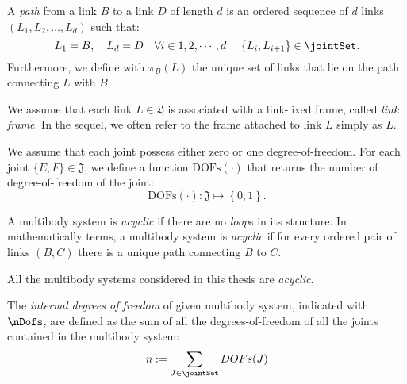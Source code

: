 \begin{definition}[Path]
A \emph{path} from a link $B$ to a link $D$ of length $d$ is an ordered sequence of $d$ links $(L_1,L_2,\dots,L_d)$ such that: 
\begin{equation}
L_1 = B, \quad L_d = D \quad \forall i \in 1,2,\cdots,d \ \hspace{1em}  \{L_i,L_{i+1}\} \in \jointSet.
\end{equation}
Furthermore, we define with $\pi_B(L)$ the unique set of links that lie on the path connecting $L$ with $B$.
\end{definition}

\begin{assumption}
We assume that each link $L \in \mathfrak{L}$ is associated with a link-fixed frame, called \emph{link frame}. In the sequel, we  often refer to the frame attached to link $L$ simply as $L$.
\end{assumption}


\begin{assumption}
We assume that each joint possess either zero or one degree-of-freedom. For each joint $\{E,F\} \in \mathfrak{J}$, we define a function $\text{DOFs}(\cdot)$ that returns the number of degree-of-freedom of the joint:
$$
\text{DOFs}(\cdot) : \mathfrak{J} \mapsto \left\{ 0,1 \right\} .
$$
\end{assumption}

\begin{definition}
A multibody system is \emph{acyclic} if there are no \emph{loop}s in its structure. In mathematically terms, a multibody system is \emph{acyclic} if for every ordered pair of links $(B,C)$ there is a unique path connecting $B$ to $C$. 
\end{definition}

\begin{assumption}
All the multibody systems considered in this thesis are \emph{acyclic}. 
\end{assumption}

\begin{definition}
The \emph{internal degrees of freedom} of given multibody system, indicated with $\nDofs$, are defined as the sum of all the degrees-of-freedom of all the joints contained in the multibody system:
\begin{equation}
n := \sum_{J \in \jointSet} DOFs(J)
\end{equation}

\end{definition}

